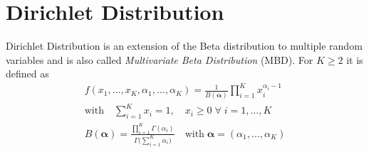 \documentclass[../../probability-notes.tex]{subfiles}
\begin{document}
    \section{Dirichlet Distribution}
    Dirichlet Distribution is an extension of the Beta distribution to multiple random variables and is also called \emph{Multivariate Beta Distribution} (MBD). For $K \geq 2$ it is defined as
    \begin{gather*}
        f(x_{1}, \ldots, x_{K}, \alpha_{1}, \ldots, \alpha_{K}) = \frac{1}{B(\bm{\alpha})} \prod_{i=1}^{K} x_{i}^{\alpha_{i} - 1}\\
        \text{with} \quad \sum_{i=1}^{K} x_{i} = 1, \quad x_{i} \geq 0 \; \forall \; i=1,\ldots,K\\
        B(\bm{\alpha}) = \frac{\prod_{i=1}^{K}\Gamma(\alpha_{i})}{\Gamma \bigg(\sum_{i=1}^{K} \alpha_{i} \bigg)} \quad \text{with} \; \bm{\alpha} = (\alpha_{1}, \ldots, \alpha_{K})
    \end{gather*}
\end{document}
